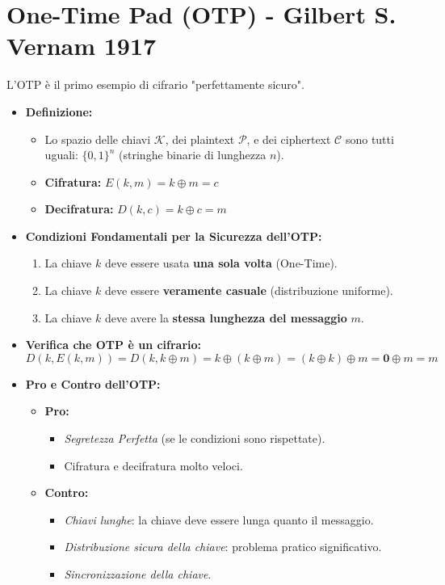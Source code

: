 \section{One-Time Pad (OTP) - Gilbert S. Vernam 1917}
L'OTP è il primo esempio di cifrario "perfettamente sicuro".
\begin{itemize}
    \item \textbf{Definizione:}
    \begin{itemize}
        \item Lo spazio delle chiavi $\mathcal{K}$, dei plaintext $\mathcal{P}$, e dei ciphertext $\mathcal{C}$ sono tutti uguali: $\{0,1\}^n$ (stringhe binarie di lunghezza $n$).
        \item \textbf{Cifratura:} $E(k, m) = k \oplus m = c$
        \item \textbf{Decifratura:} $D(k, c) = k \oplus c = m$
    \end{itemize}
    \item \textbf{Condizioni Fondamentali per la Sicurezza dell'OTP:}
    \begin{enumerate}
        \item La chiave $k$ deve essere usata \textbf{una sola volta} (One-Time).
        \item La chiave $k$ deve essere \textbf{veramente casuale} (distribuzione uniforme).
        \item La chiave $k$ deve avere la \textbf{stessa lunghezza del messaggio} $m$.
    \end{enumerate}
    \item \textbf{Verifica che OTP è un cifrario:}
    \[ D(k, E(k,m)) = D(k, k \oplus m) = k \oplus (k \oplus m) = (k \oplus k) \oplus m = \mathbf{0} \oplus m = m \]
    \item \textbf{Pro e Contro dell'OTP:}
    \begin{itemize}
        \item \textbf{Pro:}
        \begin{itemize}
            \item \textit{Segretezza Perfetta} (se le condizioni sono rispettate).
            \item Cifratura e decifratura molto veloci.
        \end{itemize}
        \item \textbf{Contro:}
        \begin{itemize}
            \item \textit{Chiavi lunghe}: la chiave deve essere lunga quanto il messaggio.
            \item \textit{Distribuzione sicura della chiave}: problema pratico significativo.
            \item \textit{Sincronizzazione della chiave}.
        \end{itemize}
    \end{itemize}
\end{itemize}

